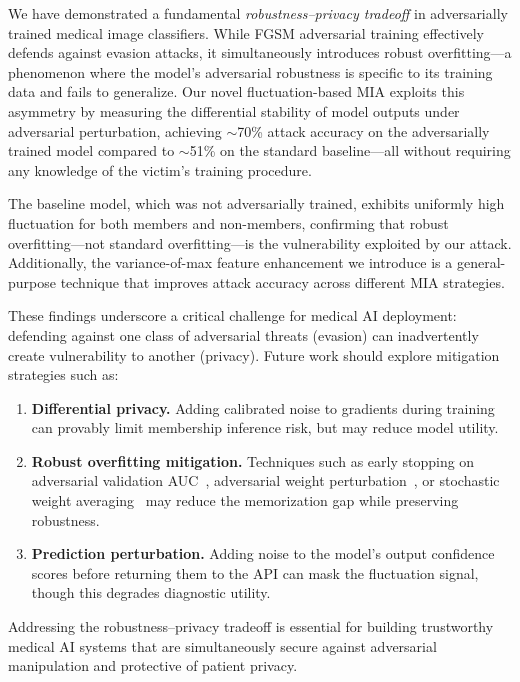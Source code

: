 \documentclass[conference]{IEEEtran}
\begin{document}
We have demonstrated a fundamental \textit{robustness--privacy tradeoff} in adversarially trained medical image classifiers. While FGSM adversarial training effectively defends against evasion attacks, it simultaneously introduces robust overfitting---a phenomenon where the model's adversarial robustness is specific to its training data and fails to generalize. Our novel fluctuation-based MIA exploits this asymmetry by measuring the differential stability of model outputs under adversarial perturbation, achieving $\sim$70\% attack accuracy on the adversarially trained model compared to $\sim$51\% on the standard baseline---all without requiring any knowledge of the victim's training procedure.

The baseline model, which was not adversarially trained, exhibits uniformly high fluctuation for both members and non-members, confirming that robust overfitting---not standard overfitting---is the vulnerability exploited by our attack. Additionally, the variance-of-max feature enhancement we introduce is a general-purpose technique that improves attack accuracy across different MIA strategies.

These findings underscore a critical challenge for medical AI deployment: defending against one class of adversarial threats (evasion) can inadvertently create vulnerability to another (privacy). Future work should explore mitigation strategies such as:

\begin{enumerate}[leftmargin=*]
    \item \textbf{Differential privacy.} Adding calibrated noise to gradients during training can provably limit membership inference risk, but may reduce model utility.
    \item \textbf{Robust overfitting mitigation.} Techniques such as early stopping on adversarial validation AUC~\cite{rice2020overfitting}, adversarial weight perturbation~\cite{wu2020adversarial}, or stochastic weight averaging~\cite{chen2021robust} may reduce the memorization gap while preserving robustness.
    \item \textbf{Prediction perturbation.} Adding noise to the model's output confidence scores before returning them to the API can mask the fluctuation signal, though this degrades diagnostic utility.
\end{enumerate}

Addressing the robustness--privacy tradeoff is essential for building trustworthy medical AI systems that are simultaneously secure against adversarial manipulation and protective of patient privacy.
\end{document}
